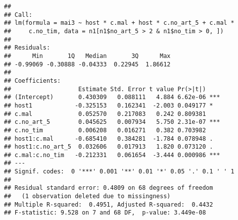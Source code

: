 \documentclass[]{article}
\newenvironment{Shaded}{\begin{snugshade}}{\end{snugshade}}
\newcommand{\KeywordTok}[1]{\textcolor[rgb]{0.13,0.29,0.53}{\textbf{#1}}}
\newcommand{\DataTypeTok}[1]{\textcolor[rgb]{0.13,0.29,0.53}{#1}}
\newcommand{\DecValTok}[1]{\textcolor[rgb]{0.00,0.00,0.81}{#1}}
\newcommand{\StringTok}[1]{\textcolor[rgb]{0.31,0.60,0.02}{#1}}
\newcommand{\OperatorTok}[1]{\textcolor[rgb]{0.81,0.36,0.00}{\textbf{#1}}}
\newcommand{\NormalTok}[1]{#1}
\begin{document}
\begin{verbatim}
## 
## Call:
## lm(formula = mai3 ~ host * c.mal + host * c.no_art_5 + c.mal * 
##     c.no_tim, data = n1[n1$no_art_5 > 2 & n1$no_tim > 0, ])
## 
## Residuals:
##      Min       1Q   Median       3Q      Max 
## -0.99069 -0.30888 -0.04333  0.22945  1.86612 
## 
## Coefficients:
##                   Estimate Std. Error t value Pr(>|t|)    
## (Intercept)       0.430309   0.088111   4.884 6.62e-06 ***
## host1            -0.325153   0.162341  -2.003 0.049177 *  
## c.mal             0.052570   0.217083   0.242 0.809381    
## c.no_art_5        0.045625   0.007934   5.750 2.31e-07 ***
## c.no_tim          0.006208   0.016271   0.382 0.703982    
## host1:c.mal      -0.685410   0.384281  -1.784 0.078948 .  
## host1:c.no_art_5  0.032606   0.017913   1.820 0.073120 .  
## c.mal:c.no_tim   -0.212331   0.061654  -3.444 0.000986 ***
## ---
## Signif. codes:  0 '***' 0.001 '**' 0.01 '*' 0.05 '.' 0.1 ' ' 1
## 
## Residual standard error: 0.4809 on 68 degrees of freedom
##   (1 observation deleted due to missingness)
## Multiple R-squared:  0.4951, Adjusted R-squared:  0.4432 
## F-statistic: 9.528 on 7 and 68 DF,  p-value: 3.449e-08
\end{verbatim}

\begin{Shaded}
\end{Shaded}
\end{document}
